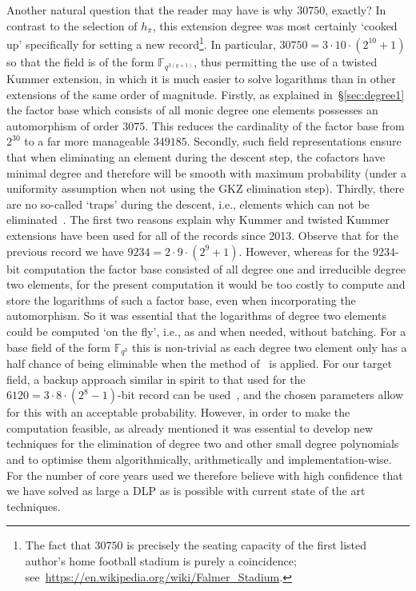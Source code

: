 \documentclass[11pt]{llncs}
\newcommand{\F}{\mathbb F}
\begin{document}
Another natural question that the reader may have is why $\num{30750}$, exactly? 
In contrast to the selection of $h_{\pi}$, this extension degree was most 
certainly `cooked up' specifically for setting a new record\footnote{The fact that $\num{30750}$ is precisely the seating 
capacity of the first listed author's home football stadium is purely a coincidence; see~\url{https://en.wikipedia.org/wiki/Falmer_Stadium}.}. In
particular, $\num{30750} = 3 \cdot 10 \cdot (2^{10} + 1)$ so that the field is of the form $\F_{q^{3(q+1)}}$, thus permitting the use 
of a twisted Kummer extension, in which it is much easier to solve logarithms than in other extensions of the same order of magnitude. Firstly, as explained in~\S\ref{sec:degree1} the factor base which consists of all monic degree one elements possesses an automorphism of order 
$\num{3075}$. This reduces the cardinality of the factor base from $2^{30}$ to a far more manageable $\num{349185}$. Secondly, such field representations ensure that when eliminating an element during the descent step, the cofactors have minimal degree and therefore will be smooth with maximum probability (under a uniformity assumption when not using the GKZ elimination step). Thirdly, there are no so-called `traps' during the descent, i.e., elements which can not be eliminated~\cite{GKZ18}. The first two reasons explain why Kummer and twisted Kummer extensions have been used for all of the records since 2013.
Observe that for the previous record we have $\num{9234} = 2 \cdot 9 \cdot (2^9+1)$. However, whereas for the $\num{9234}$-bit computation the 
factor base consisted of all degree one and irreducible degree two elements, for the present computation it would be too costly to compute and store the 
logarithms of such a factor base, even when incorporating the automorphism. So it was essential that the logarithms of degree two elements could be 
computed `on the fly', i.e., as and when needed, without batching. For a base field of the form $\F_{q^3}$ this is non-trivial as each degree two element 
only has a half chance of being eliminable when the method of~\cite{GGMZ13a} is applied. For our target field, a backup approach similar in spirit to that 
used for the $\num{6120} = 3 \cdot 8 \cdot (2^8-1)$-bit record can be used~\cite{6120Ann,GGMZ13b}, and the chosen parameters allow for this with an acceptable probability. However, in order to make the computation feasible, as already mentioned it was essential to develop new techniques for the elimination of degree two and other small degree polynomials and to optimise them algorithmically, arithmetically and implementation-wise. For the number of core years used we therefore believe with high confidence that we have solved as large a DLP as is possible with current state of the art techniques.
\end{document}
